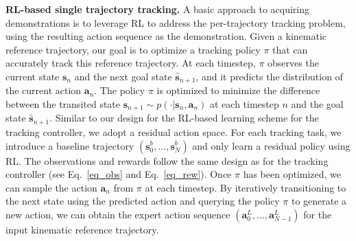 \noindent\textbf{RL-based single trajectory tracking.} 
A basic approach to acquiring demonstrations is to leverage RL to address the per-trajectory tracking problem, using the resulting action sequence as the demonstration. Given a kinematic reference trajectory, our goal is to optimize a tracking policy \(\pi\) that can accurately track this reference trajectory. At each timestep, \(\pi\) observes the current state \(\mathbf{s}_n\) and the next goal state \(\hat{\mathbf{s}}_{n+1}\), and it predicts the distribution of the current action \(\mathbf{a}_n\).
The policy \(\pi\) is optimized to minimize the difference between the transited state \(\mathbf{s}_{n+1} \sim p(\cdot \vert \mathbf{s}_n, \mathbf{a}_n)\) at each timestep \(n\) and the goal state \(\hat{\mathbf{s}}_{n+1}\). Similar to our design for the RL-based learning scheme for the tracking controller, we adopt a residual action space. For each tracking task, we introduce a baseline trajectory \((\mathbf{s}^b_0, ..., \mathbf{s}^b_N)\) and only learn a residual policy using RL. The observations and rewards follow the same design as for the tracking controller (see Eq.~\ref{eq_obs} and Eq.~\ref{eq_rew}).
Once \(\pi\) has been optimized, we can sample the action \(\mathbf{a}_n\) from \(\pi\) at each timestep. By iteratively transitioning to the next state using the predicted action and querying the policy \(\pi\) to generate a new action, we can obtain the expert action sequence \((\mathbf{a}_0^L, ..., \mathbf{a}_{N-1}^L)\) for the input kinematic reference trajectory.


